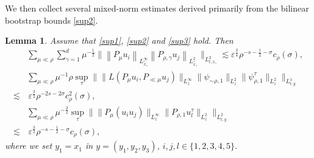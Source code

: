\documentclass[11pt,letterpaper,reqno]{amsart}
\numberwithin{equation}{section}
\newtheorem{lemma}[theorem]{Lemma}
\theoremstyle{definition}
\theoremstyle{remark}
\begin{document}
We then collect several mixed-norm estimates derived primarily from the bilinear bootstrap bounds \eqref{sup2}.
\begin{lemma} Assume that  \eqref{sup1}, \eqref{sup2} and \eqref{sup3} hold. Then
    \begin{align}
        &  \sum_{\mu\ll \rho}  \sum_{\gamma=1}^d \mu^{-\frac 12} \big\| \left\|P_{\mu } u_i\right\|_{L^\infty_{\widehat{x}_\gamma}} \left\|P_{  \rho,\gamma}    u_j\right\|_{L^2_{\widehat{x}_\gamma}}\big\|_{L^2_{t,x_\gamma}} \lesssim  
 \varepsilon^{\frac 34}     \rho^{-s-\frac12-\sigma} c_{\rho} (\sigma), \label{pre.bi1}\\
 & \sum_{\mu \ll \rho} \mu^{-1} \rho \sup_\tau\Big\| \|    	L(P_{ \mu} u_i, P_{\ll \mu }u_j)  \|_{L^\infty_z} \|    \psi_{\sim \rho,1} \|_{L^2_z}   \|     \psi _{\rho,1}^\tau\|_{L^2_z}     \Big\|_{L^1_{t,y}}   \nonumber  \\
 \lesssim&\, \varepsilon^{\frac32}    \rho^{-2s  -2\sigma}c_{\rho }^2 (\sigma), \label{pre.bi2} \\
 & \sum_{\mu \ll \rho} \mu^{-\frac 32} \sup_\tau  \Big\| \|    	 P_{  \mu } (u_i u_j) \|_{L^\infty_z} \|   P_{ \rho,1} u_l^\tau \|_{L^2_z}     \Big\|_{L^2_{t,y}}   \nonumber  \\
 \lesssim&\, \varepsilon^{\frac 32} \rho^{-s-\frac12-\sigma} c_\rho(\sigma), \label{pre.bi3} 
    \end{align}
    where we set \(y_1=x_1\) in \(y=(y_1,y_2,y_3)\),  $ i,j,l \in\{1,2,3,4,5\} $.
\end{lemma}
\end{document}
